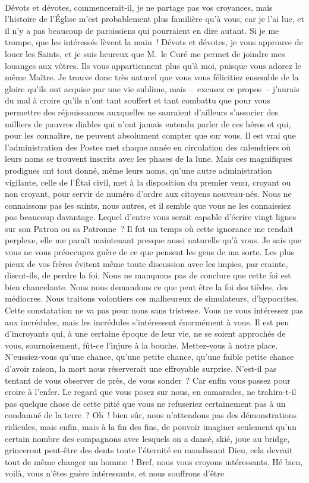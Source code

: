 \documentclass[french,twoside]{book} %
\begin{document}
\noindent  \par
Dévots et dévotes, commencerait-il, je ne partage pas vos croyances, mais l’histoire de l’Église m’est probablement plus familière qu’à vous, car je l’ai lue, et il n’y a pas beaucoup de paroissiens qui pourraient en dire autant. Si je me trompe, que les intéressés lèvent la main ! Dévots et dévotes, je vous approuve de louer les Saints, et je suis heureux que M. le Curé me permet de joindre mes louanges aux vôtres. Ils vous appartiennent plus qu’à moi, puisque vous adorez le même Maître. Je trouve donc très naturel que vous vous félicitiez ensemble de la gloire qu’ils ont acquise par une vie sublime, mais – excusez ce propos – j’aurais du mal à croire qu’ils n’ont tant souffert et tant combattu que pour vous permettre des réjouissances auxquelles ne sauraient d’ailleurs s’associer des milliers de pauvres diables qui n’ont jamais entendu parler de ces héros et qui, pour les connaître, ne peuvent absolument compter que sur vous. Il est vrai que l’administration des Postes met chaque année en circulation des calendriers où leurs noms se trouvent inscrits avec les phases de la lune. Mais ces magnifiques prodigues ont tout donné, même leurs noms, qu’une autre administration vigilante, celle de l’Étai civil, met à la disposition du premier venu, croyant ou non croyant, pour servir de numéro d’ordre aux citoyens nouveau-nés. Nous ne connaissons pas les saints, nous autres, et il semble que vous ne les connaissiez pas beaucoup davantage. Lequel d’entre vous serait capable d’écrire vingt lignes sur son Patron ou sa Patronne ? Il fut un temps où cette ignorance me rendait perplexe, elle me paraît maintenant presque aussi naturelle qu’à vous. Je sais que vous ne vous préoccupez guère de ce que pensent les gens de ma sorte. Les plus pieux de vos frères évitent même toute discussion avec les impies, par crainte, disent-ils, de perdre la foi. Nous ne manquons pas de conclure que cette foi est bien chancelante. Nous nous demandons ce que peut être la foi des tièdes, des médiocres. Nous traitons volontiers ces malheureux de simulateurs, d’hypocrites. Cette constatation ne va pas pour nous sans tristesse. Vous ne vous intéressez pas aux incrédules, mais les incrédules s’intéressent énormément à vous. Il est peu d’incroyants qui, à une certaine époque de leur vie, ne se soient approchés de vous, sournoisement, fût-ce l’injure à la bouche. Mettez-vous à notre place. N’eussiez-vous qu’une chance, qu’une petite chance, qu’une faible petite chance d’avoir raison, la mort nous réserverait une effroyable surprise. N’est-il pas tentant de vous observer de près, de vous sonder ? Car enfin vous passez pour croire à l’enfer. Le regard que vous posez sur nous, en camarades, ne trahira-t-il pas quelque chose de cette pitié que vous ne refuseriez certainement pas à un condamné de la terre ? Oh ! bien sûr, nous n’attendons pas des démonstrations ridicules, mais enfin, mais à la fin des fins, de pouvoir imaginer seulement qu’un certain nombre des compagnons avec lesquels on a dansé, skié, joue au bridge, grinceront peut-être des dents toute l’éternité en maudissant Dieu, cela devrait tout de même changer un homme ! Bref, nous vous croyons intéressants. Hé bien, voilà, vous n’êtes guère intéressants, et nous souffrons d’être 
\end{document}
